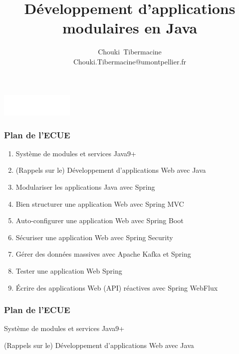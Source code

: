 \documentclass{beamer}
\title[]{\Large{Développement d'applications modulaires en Java}}
\author[C. Tibermacine]{\large{Chouki~Tibermacine}\\
\small{Chouki.Tibermacine@umontpellier.fr}}
\date{}
\begin{document}
\begin{frame}
\titlepage
\begin{flushright}
\includegraphics[width=3.5cm]{figs/polytech.png}
\end{flushright}
\end{frame}

\begin{frame}
  \frametitle{Plan de l'ECUE}
\begin{enumerate}
\item Système de modules et services Java9+
\item (Rappels sur le) Développement d'applications Web avec Java
\item Modulariser les applications Java avec Spring
\item Bien structurer une application Web avec Spring MVC
\item Auto-configurer une application Web avec Spring Boot
\item Sécuriser une application Web avec Spring Security
\item Gérer des données massives avec Apache Kafka et Spring
\item Tester une application Web Spring
\item Écrire des applications Web (API) réactives avec Spring WebFlux
\end{enumerate}
\end{frame}


\begin{frame}
  \frametitle{Plan de l'ECUE}
\begin{enumerate}
	{\color{gray}			\item Système de modules et services Java9+}
\item (Rappels sur le) Développement d'applications Web avec Java
  {\color{gray}{
	\item Modulariser les applications Java avec Spring
  	\item Bien structurer une application Web avec Spring MVC
  	\item Auto-configurer une application Web avec Spring Boot
  	\item Sécuriser une application Web avec Spring Security
  	\item Gérer des données massives avec Apache Kafka et Spring		
  	\item Tester une application Web Spring
  	\item Écrire des applications Web (API) réactives avec Spring WebFlux}}
  \end{enumerate}
\end{frame}
\end{document}
